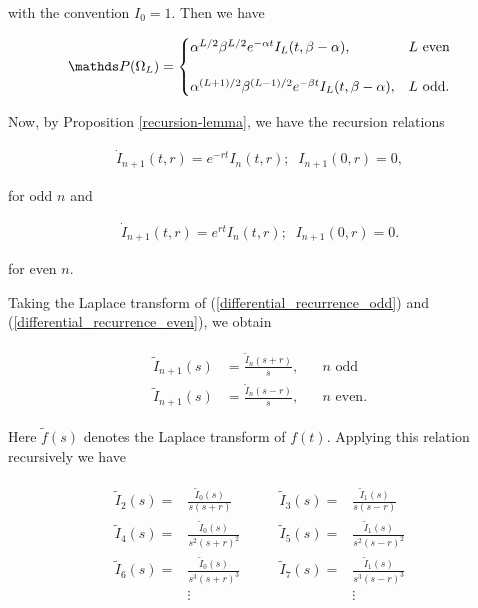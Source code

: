  with the convention $I_0 = 1$. Then we have
  
 \begin{align}
  \bP(\Omega_L) =  \begin{cases}   \alpha^{L/2}\beta^{L/2}e^{-\alpha t}I_L(t,\beta - \alpha), & \text{$L$ even}\\
  & \\
  \alpha^{(L+1)/2}\beta^{(L-1)/2}e^{-\beta t}I_L(t,\beta - \alpha), & \text{$L$ odd}.
  \end{cases}
 \end{align}
  
Now, by Proposition \ref{recursion-lemma}, we have the recursion relations 

  \begin{align}\label{differential_recurrence_odd}
    \dot{I}_{n+1}(t,r) = e^{-rt}  I_n(t,r); \; \; I_{n+1}(0,r) = 0,
  \end{align}

  for odd $n$ and

  \begin{align}\label{differential_recurrence_even}
    \dot{I}_{n+1}(t,r) = e^{rt}  I_n(t,r); \; \; I_{n+1}(0,r) = 0.
  \end{align}

  for even $n$.


Taking the Laplace transform of (\ref{differential_recurrence_odd}) and (\ref{differential_recurrence_even}), we obtain


\begin{align}
\begin{split}
\tilde{I}_{n+1}(s) &= \frac{\tilde{I}_n(s+r)}{s}, \hspace{20pt} \text{$n$ odd} \\
\tilde{I}_{n+1}(s) &= \frac{\tilde{I}_n(s-r)}{s}, \hspace{20pt} \text{$n$ even}.
\end{split}
\end{align}

Here $\tilde{f}(s)$ denotes the Laplace transform of $f(t)$. Applying this relation recursively we have 

\begin{align}
\begin{split}
\tilde{I}_2(s) =& \frac{\tilde{I}_0(s)}{s(s+r)}\\
\tilde{I}_4(s) =& \frac{\tilde{I}_0(s)}{s^2(s+r)^2}\\
\tilde{I}_6(s) =& \frac{\tilde{I}_0(s)}{s^3(s+r)^3}\\
&\vdots
\end{split}
\quad\quad
\begin{split}
\tilde{I}_3(s) =& \frac{\tilde{I}_1(s)}{s(s-r)}\\
\tilde{I}_5(s) =& \frac{\tilde{I}_1(s)}{s^2(s-r)^2}\\
\tilde{I}_7(s) =& \frac{\tilde{I}_1(s)}{s^3(s-r)^3}\\
&\vdots
\end{split}
\end{align}

